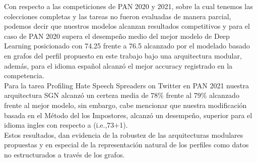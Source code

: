 	Con respecto a las competiciones de PAN 2020 y 2021, sobre la cual tenemos las colecciones completas y las tareas no fueron evaluadas de manera parcial, podemos decir que nuestros modelos alcanzan resultados competitivos y para el caso de PAN 2020 supera el desempeño medio del mejor modelo de Deep Learning \citep{giglou:2020} posicionado con 74.25 frente a 76.5 alcanzado por el modelado basado en grafos del perfil propuesto en este trabajo bajo una arquitectura modular, además, para el idioma español alcanzó el mejor accuracy registrado en la competencia. 
	\\
	Para la tarea Profiling Hate Speech Spreaders on Twitter en PAN 2021 nuestra arquitectura SGN alcanzó un certeza media de 78\% frente al 79\% alcanzado frente al mejor modelo, sin embargo, cabe mencionar que nuestra modificación basada en el Método del los Impostores, alcanzó un desempeño, superior para el idioma ingles con respecto a  \citep{sinno:2021} (i.e.,73$+$1).
	\\
	Estos resultados, dan evidencia de la robustez de las arquitecturas modulares propuestas y en especial de la representación natural de los perfiles como datos no estructurados a través de los grafos.